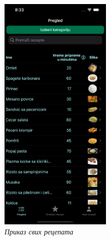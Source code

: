 \documentclass[12pt,oneside]{memoir}
\begin{document}
\begin{figure} [H]
    \centering
    \captionsetup{justification=centering}
    \includegraphics[width=0.475\textwidth]{images/simulators/testing images/general tab.png}
    \caption{\textit{Приказ свих рецепата}}
    \label{slika:приказ_свих_рецепата}
\end{figure}
\end{document}
